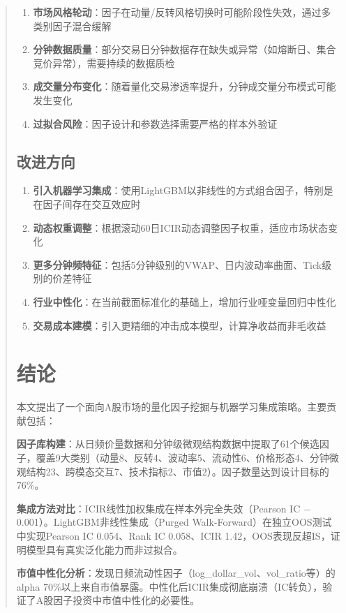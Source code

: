 \documentclass[12pt,a4paper]{article}
\begin{document}
\begin{abstract}
\begin{enumerate}[label=(\arabic*)]
    \item \textbf{市场风格轮动}：因子在动量/反转风格切换时可能阶段性失效，通过多类别因子混合缓解
    \item \textbf{分钟数据质量}：部分交易日分钟数据存在缺失或异常（如熔断日、集合竞价异常），需要持续的数据质检
    \item \textbf{成交量分布变化}：随着量化交易渗透率提升，分钟成交量分布模式可能发生变化
    \item \textbf{过拟合风险}：因子设计和参数选择需要严格的样本外验证
\end{enumerate}

\subsection{改进方向}

\begin{enumerate}[label=(\arabic*)]
    \item \textbf{引入机器学习集成}：使用LightGBM以非线性的方式组合因子，特别是在因子间存在交互效应时
    \item \textbf{动态权重调整}：根据滚动60日ICIR动态调整因子权重，适应市场状态变化
    \item \textbf{更多分钟频特征}：包括5分钟级别的VWAP、日内波动率曲面、Tick级别的价差特征
    \item \textbf{行业中性化}：在当前截面标准化的基础上，增加行业哑变量回归中性化
    \item \textbf{交易成本建模}：引入更精细的冲击成本模型，计算净收益而非毛收益
\end{enumerate}

\section{结论}

本文提出了一个面向A股市场的量化因子挖掘与机器学习集成策略。主要贡献包括：

\textbf{因子库构建}：从日频价量数据和分钟级微观结构数据中提取了61个候选因子，覆盖9大类别（动量8、反转4、波动率5、流动性6、价格形态4、分钟微观结构23、跨模态交互7、技术指标2、市值2）。因子数量达到设计目标的76\%。

\textbf{集成方法对比}：ICIR线性加权集成在样本外完全失效（Pearson IC $-$0.001）。LightGBM非线性集成（Purged Walk-Forward）在独立OOS测试中实现Pearson IC 0.054、Rank IC 0.058、ICIR 1.42，OOS表现反超IS，证明模型具有真实泛化能力而非过拟合。

\textbf{市值中性化分析}：发现日频流动性因子（log\_dollar\_vol、vol\_ratio等）的alpha 70\%以上来自市值暴露。中性化后ICIR集成彻底崩溃（IC转负），验证了A股因子投资中市值中性化的必要性。


\end{abstract}
\end{document}
